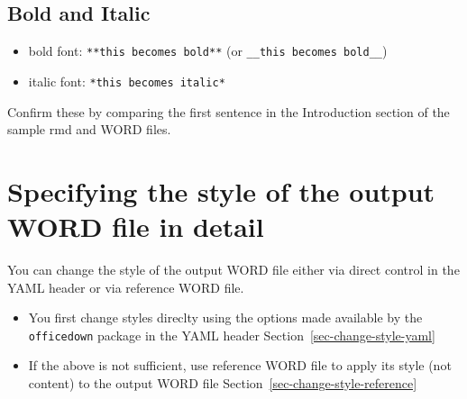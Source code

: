 \documentclass[
  letterpaper,
  DIV=11,
  numbers=noendperiod]{scrreprt}
\providecommand{\tightlist}{%
  \setlength{\itemsep}{0pt}\setlength{\parskip}{0pt}}\usepackage{longtable,booktabs,array}
\begin{document}
\hypertarget{bold-and-italic}{%
\subsection{Bold and Italic}\label{bold-and-italic}}

\begin{itemize}
\tightlist
\item
  bold font: \texttt{**this\ becomes\ bold**} (or
  \texttt{\_\_this\ becomes\ bold\_\_})
\item
  italic font: \texttt{*this\ becomes\ italic*}
\end{itemize}

\begin{tcolorbox}[enhanced jigsaw, colframe=quarto-callout-note-color-frame, toptitle=1mm, colbacktitle=quarto-callout-note-color!10!white, toprule=.15mm, colback=white, arc=.35mm, bottomtitle=1mm, opacitybacktitle=0.6, breakable, left=2mm, coltitle=black, leftrule=.75mm, title=\textcolor{quarto-callout-note-color}{\faInfo}\hspace{0.5em}{Note}, rightrule=.15mm, titlerule=0mm, opacityback=0, bottomrule=.15mm]

Confirm these by comparing the first sentence in the Introduction
section of the sample rmd and WORD files.

\end{tcolorbox}

\hypertarget{sec-word-specify-style}{%
\section{Specifying the style of the output WORD file in
detail}\label{sec-word-specify-style}}

You can change the style of the output WORD file either via direct
control in the YAML header or via reference WORD file.

\begin{tcolorbox}[enhanced jigsaw, colframe=quarto-callout-tip-color-frame, toptitle=1mm, colbacktitle=quarto-callout-tip-color!10!white, toprule=.15mm, colback=white, arc=.35mm, bottomtitle=1mm, opacitybacktitle=0.6, breakable, left=2mm, coltitle=black, leftrule=.75mm, title=\textcolor{quarto-callout-tip-color}{\faLightbulb}\hspace{0.5em}{Tip}, rightrule=.15mm, titlerule=0mm, opacityback=0, bottomrule=.15mm]

\begin{itemize}
\tightlist
\item
  You first change styles direclty using the options made available by
  the \texttt{officedown} package in the YAML header
  Section~\ref{sec-change-style-yaml}
\item
  If the above is not sufficient, use reference WORD file to apply its
  style (not content) to the output WORD file
  Section~\ref{sec-change-style-reference}
\end{itemize}

\end{tcolorbox}
\end{document}
